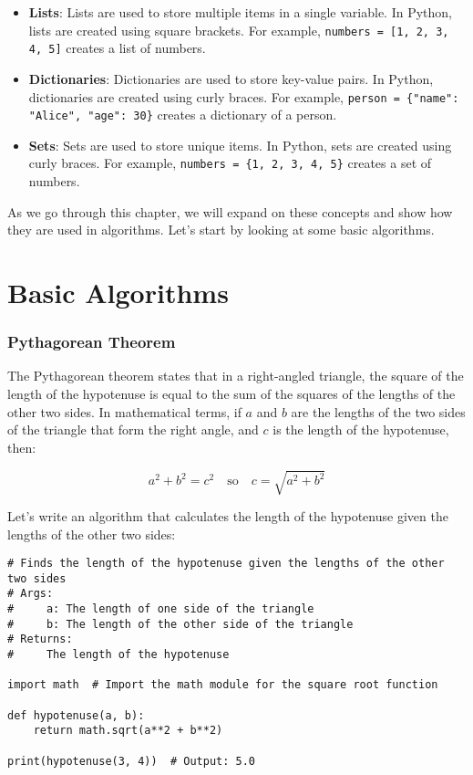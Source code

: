 \begin{itemize}
    \item \textbf{Lists}: Lists are used to store multiple items in a single variable. In Python, lists are created using square brackets. For example, \texttt{numbers = [1, 2, 3, 4, 5]} creates a list of numbers.
    \item \textbf{Dictionaries}: Dictionaries are used to store key-value pairs. In Python, dictionaries are created using curly braces. For example, \texttt{person = \{"name": "Alice", "age": 30\}} creates a dictionary of a person.
    \item \textbf{Sets}: Sets are used to store unique items. In Python, sets are created using curly braces. For example, \texttt{numbers = \{1, 2, 3, 4, 5\}} creates a set of numbers.
\end{itemize}

As we go through this chapter, we will expand on these concepts and show how they are used in algorithms. Let's start by looking at some basic algorithms.

\section{Basic Algorithms}

\subsubsection{Pythagorean Theorem}

The Pythagorean theorem states that in a right-angled triangle, the square of the length of the hypotenuse is equal to the sum of the squares of the lengths of the other two sides. In mathematical terms, if $a$ and $b$ are the lengths of the two sides of the triangle that form the right angle, and $c$ is the length of the hypotenuse, then:

\begin{equation}
    a^2 + b^2 = c^2 \quad \text{so} \quad c = \sqrt{a^2 + b^2}
\end{equation}

Let's write an algorithm that calculates the length of the hypotenuse given the lengths of the other two sides:

\begin{lstlisting}
# Finds the length of the hypotenuse given the lengths of the other two sides
# Args:
#     a: The length of one side of the triangle
#     b: The length of the other side of the triangle
# Returns:
#     The length of the hypotenuse

import math  # Import the math module for the square root function

def hypotenuse(a, b):
    return math.sqrt(a**2 + b**2)

print(hypotenuse(3, 4))  # Output: 5.0
\end{lstlisting}

